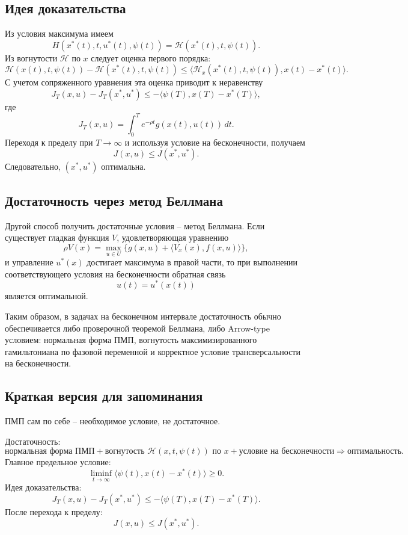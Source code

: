 \documentclass[12pt,a4paper]{article}
\begin{document}
\subsection{Идея доказательства}

Из условия максимума имеем
\[
    H(x^*(t),t,u^*(t),\psi(t))=\mathcal H(x^*(t),t,\psi(t)).
\]
Из вогнутости \(\mathcal H\) по \(x\) следует оценка первого порядка:
\[
    \mathcal H(x(t),t,\psi(t))-\mathcal H(x^*(t),t,\psi(t))
    \le
    \langle \mathcal H_x(x^*(t),t,\psi(t)),x(t)-x^*(t)\rangle.
\]
С учетом сопряженного уравнения эта оценка приводит к неравенству
\[
    J_T(x,u)-J_T(x^*,u^*)
    \le
    -\langle \psi(T),x(T)-x^*(T)\rangle,
\]
где
\[
    J_T(x,u)=\int_0^T e^{-\rho t}g(x(t),u(t))\,dt.
\]
Переходя к пределу при \(T\to\infty\) и используя условие на бесконечности, получаем
\[
    J(x,u)\le J(x^*,u^*).
\]
Следовательно, \((x^*,u^*)\) оптимальна.

\subsection{Достаточность через метод Беллмана}

Другой способ получить достаточные условия -- метод Беллмана. Если существует гладкая функция \(V\), удовлетворяющая уравнению
\[
    \rho V(x)=\max_{u\in U}\{g(x,u)+\langle V_x(x),f(x,u)\rangle\},
\]
и управление \(u^*(x)\) достигает максимума в правой части, то при выполнении соответствующего условия на бесконечности обратная связь
\[
    u(t)=u^*(x(t))
\]
является оптимальной.

Таким образом, в задачах на бесконечном интервале достаточность обычно обеспечивается либо проверочной теоремой Беллмана, либо Arrow-type условием: нормальная форма ПМП, вогнутость максимизированного гамильтониана по фазовой переменной и корректное условие трансверсальности на бесконечности.

\subsection{Краткая версия для запоминания}

ПМП сам по себе -- необходимое условие, не достаточное.

Достаточность:
\[
    \text{нормальная форма ПМП}
    +
    \text{вогнутость }\mathcal H(x,t,\psi(t))\text{ по }x
    +
    \text{условие на бесконечности}
    \Rightarrow
    \text{оптимальность}.
\]
Главное предельное условие:
\[
    \liminf_{t\to\infty}\langle \psi(t),x(t)-x^*(t)\rangle\ge0.
\]
Идея доказательства:
\[
    J_T(x,u)-J_T(x^*,u^*)
    \le
    -\langle\psi(T),x(T)-x^*(T)\rangle.
\]
После перехода к пределу:
\[
    J(x,u)\le J(x^*,u^*).
\]
\end{document}
